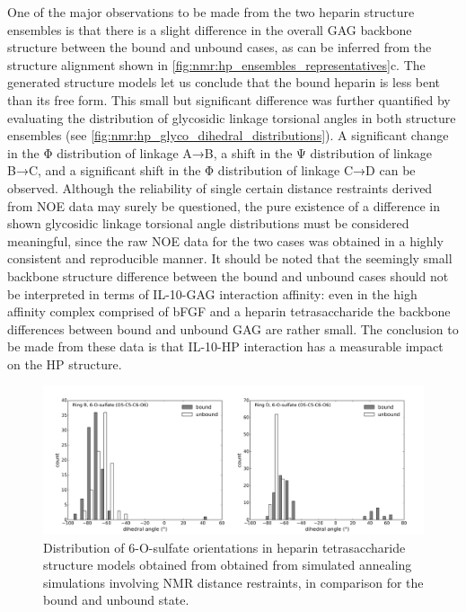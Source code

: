 One of the major observations to be made from the two heparin structure
ensembles is that there is a slight difference in the overall GAG backbone
structure between the bound and unbound cases, as can be inferred from the
structure alignment shown in \cref{fig:nmr:hp_ensembles_representatives}c. The
generated structure models let us conclude that the bound heparin is less bent
than its free form. This small but significant difference was further quantified
by evaluating the distribution of glycosidic linkage torsional angles in both
structure ensembles (see \cref{fig:nmr:hp_glyco_dihedral_distributions}). A
significant change in the Φ distribution of linkage A→B, a shift in the Ψ
distribution of linkage B→C, and a significant shift in the Φ distribution of
linkage C→D can be observed. Although the reliability of single certain distance
restraints derived from NOE data may surely be questioned, the pure existence of
a difference in shown glycosidic linkage torsional angle distributions must be
considered meaningful, since the raw NOE data for the two cases was obtained in
a highly consistent and reproducible manner. It should be noted that the
seemingly small backbone structure difference between the bound and unbound
cases should not be interpreted in terms of IL-10-GAG interaction affinity: even
in the high affinity complex comprised of bFGF and a heparin tetrasaccharide
\cite{faham_heparin_1996,mikhailov_hp_tetra_1996} the backbone differences
between bound and unbound GAG are rather small. The conclusion to be made from
these data is that IL-10-HP interaction has a measurable impact on the HP
structure.

\begin{figure}
\centering
\includegraphics[width=\textwidth]{gfx/nmr/SI_figure_6O_sulfate_dihedrals_B_D_01.png}
\caption[]{
Distribution of 6-O-sulfate orientations in heparin tetrasaccharide structure
models obtained from obtained from simulated annealing simulations involving NMR
distance restraints, in comparison for the bound and unbound state.}
\label{fig:nmr:hp_sulfate_orientations}
\end{figure}


